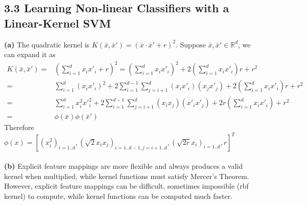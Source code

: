\documentclass{article}
\begin{document}
\subsection*{3.3 Learning Non-linear Classifiers with a Linear-Kernel SVM}
\textbf{(a)} The quadratic kernel is $K(\bar{x},\bar{x}')=(\bar{x}\cdot \bar{x}'+r)^2$.
Suppose $\bar{x},\bar{x}'\in \mathbb{R}^d$, we can expand it as
\begin{align*}
K(\bar{x},\bar{x}')=&(\sum_{i=1}^{d}x_ix'_i+r)^2=(\sum_{i=1}^{d}x_ix'_i)^2+2(\sum_{i=1}^{d}x_ix'_i)r+r^2 \\
=& \sum_{i=1}^d (x_ix'_i)^2+2\sum_{i=1}^{d-1}\sum_{j=i+1}^d (x_ix'_i)(x_jx'_j)+2(\sum_{i=1}^{d}x_ix'_i)r+r^2 \\
=& \sum_{i=1}^d x_i^2 x'_i^2+2\sum_{i=1}^{d-1}\sum_{j=i+1}^d (x_ix_j)(x'_ix'_j)+2r(\sum_{i=1}^{d}x_ix'_i)+r^2 \\
=& \phi(\bar{x}) \phi(\bar{x}')
\end{align*}
Therefore $\phi(x)=[(x_i^2)_{i=1..d}, (\sqrt{2}x_ix_j)_{i=1..d-1, j=i+1..d}, (\sqrt{2r}x_i)_{i=1..d}, r]^T$ \\\\
\textbf{(b)} Explicit feature mappings are more flexible and always produces a valid kernel when multiplied,
while kernel functions must satisfy Mercer's Theorem.
However, explicit feature mappings can be difficult, sometimes impossible (rbf kernel) to compute,
while kernel functions can be computed much faster.
\end{document}
